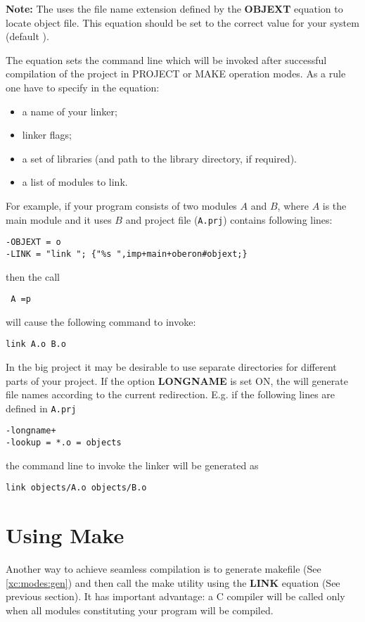 {\bf Note:} The \XDS{} uses the file name extension defined
by the {\bf OBJEXT} equation to locate object file.
This equation should be set to the correct value for your system
(default {\bf \Obj}).

The 
equation sets the command line which will be invoked after
successful compilation of the project in PROJECT or MAKE operation modes.
As a rule one have to specify in the equation:
\begin{itemize}
\item   a name of your linker;
\item   linker flags;
\item   a set of libraries (and path to the library directory, if required).
\item   a list of modules to link.
\end{itemize}
For example, if your program consists of two modules $A$ and $B$,
where $A$ is the main module and it uses $B$ and project file
({\tt A.prj}) contains following lines:
\begin{verbatim}
-OBJEXT = o
-LINK = "link "; {"%s ",imp+main+oberon#objext;}
\end{verbatim}
then the call
\begin{flushleft} \tt
        \XC{} A =p
\end{flushleft}
will cause the following command to invoke:
\begin{verbatim}
link A.o B.o
\end{verbatim}

In the big project it may be desirable to use separate directories for
different parts of your project. If the option {\bf LONGNAME} is set
ON, the \XDS{} will generate file names according to the current redirection.
E.g. if the following lines are defined in {\tt A.prj}
\begin{verbatim}
-longname+
-lookup = *.o = objects
\end{verbatim}
the command line to invoke the linker will be generated as
\begin{verbatim}
link objects/A.o objects/B.o
\end{verbatim}

\section{Using Make}\label{seamless:make}

Another way to achieve seamless compilation is to generate
makefile (See \ref{xc:modes:gen}) and then call the make
utility using the {\bf LINK} equation (See previous section).  It has
important advantage: a C compiler will be called only when all modules
constituting your program will be compiled.

